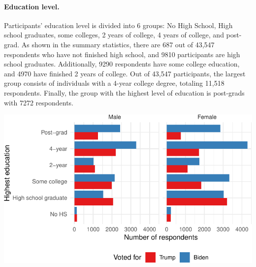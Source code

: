 \documentclass[
  letterpaper,
  DIV=11,
  numbers=noendperiod]{scrartcl}
\let\oldparagraph\paragraph
\renewcommand{\paragraph}[1]{\oldparagraph{#1}\mbox{}}
\begin{document}
\hypertarget{education-level.}{%
\paragraph{Education level.}\label{education-level.}}

Participants' education level is divided into 6 groups: No High School,
High school graduates, some colleges, 2 years of college, 4 years of
college, and post-grad. As shown in the summary statistics, there are
687 out of 43,547 respondents who have not finished high school, and
9810 participants are high school graduates. Additionally, 9290
respondents have some college education, and 4970 have finished 2 years
of college. Out of 43,547 participants, the largest group consists of
individuals with a 4-year college degree, totaling 11,518 respondents.
Finally, the group with the highest level of education is post-grads
with 7272 respondents.

\includegraphics{paper_files/figure-pdf/unnamed-chunk-5-1.pdf}
\end{document}
